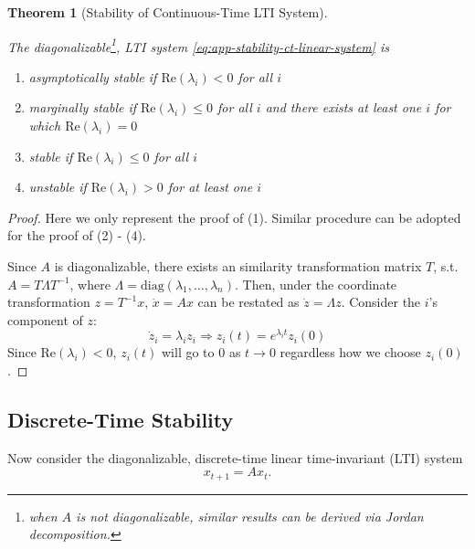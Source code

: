 \documentclass[
]{book}
\newtheorem{theorem}{Theorem}[chapter]
\theoremstyle{definition}
\theoremstyle{definition}
\theoremstyle{definition}
\theoremstyle{definition}
\theoremstyle{remark}
\begin{document}
\begin{theorem}[Stability of Continuous-Time LTI System]
\protect\hypertarget{thm:ltistable}{}\label{thm:ltistable}

The diagonalizable\footnote{when \(A\) is not diagonalizable, similar results can be derived via Jordan decomposition.}, LTI system \eqref{eq:app-stability-ct-linear-system} is

\begin{enumerate}
\def\labelenumi{\arabic{enumi}.}
\item
  asymptotically stable if \(\text{Re} (\lambda_i) < 0\) for all \(i\)
\item
  marginally stable if \(\text{Re} (\lambda_i) \le 0\) for all \(i\) and there exists at least one \(i\) for which \(\text{Re} (\lambda_i) = 0\)
\item
  stable if \(\text{Re} (\lambda_i) \le 0\) for all \(i\)
\item
  unstable if \(\text{Re} (\lambda_i) > 0\) for at least one \(i\)
\end{enumerate}

\end{theorem}

\begin{proof}

Here we only represent the proof of (1). Similar procedure can be adopted for the proof of (2) - (4).

Since \(A\) is diagonalizable, there exists an similarity transformation matrix \(T\), s.t. \(A = T \Lambda T^{-1}\), where \(\Lambda = \text{diag}(\lambda_1, \dots, \lambda_n)\). Then, under the coordinate transformation \(z = T^{-1} x\), \(\dot{x} = Ax\) can be restated as \(\dot{z} = \Lambda z\). Consider the \(i\)'s component of \(z\):
\begin{equation*}
   \dot{z}_i = \lambda_i z_i \Longrightarrow z_i(t) = e^{\lambda_i t} z_i(0)
\end{equation*}
Since \(\text{Re}(\lambda_i) < 0\), \(z_i(t)\) will go to \(0\) as \(t \rightarrow 0\) regardless how we choose \(z_i(0)\).

\end{proof}

\hypertarget{app-lti-stability-dt}{%
\subsection{Discrete-Time Stability}\label{app-lti-stability-dt}}

Now consider the diagonalizable, discrete-time linear time-invariant (LTI) system
\begin{equation}
x_{t+1} = A x_t.
\label{eq:app-stability-dt-linear-system}
\end{equation}
\end{document}

